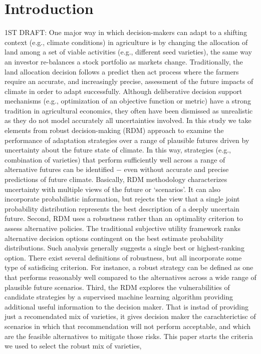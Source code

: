 \documentclass[syngen,nonblindrev]{informs3-syngen}
\begin{document}
\section{Introduction}
1ST DRAFT:
One major way in which decision-makers can adapt to a shifting context (e.g., climate conditions) in agriculture is by changing the allocation of land among a set of viable activities (e.g., different seed varieties), the same way an investor re-balances a stock portfolio as markets change. Traditionally, the land allocation decision follows a predict then act process where the farmers require an accurate, and increasingly precise, assessment of the future impacts of climate in order to adapt successfully. Although deliberative decision support mechanisms (e.g., optimization of an objective function or metric) have a strong tradition in agricultural economics, they often have been dismissed as unrealistic as they do not model accurately all uncertainties involved. 
In this study we take elements from robust decision-making (RDM) approach to examine the performance of adaptation strategies over a range of plausible futures driven by uncertainty about the future state of climate. In this way, strategies (e.g., combination of varieties) that perform sufficiently well across a range of alternative futures can be identified − even without accurate and precise predictions of future climate.
Basically, RDM methodology characterizes uncertainty with multiple views of the future or ‘scenarios’. It can also incorporate probabilistic information, but rejects the view that a single joint probability distribution represents the best description of a deeply uncertain future. Second, RDM uses a robustness rather than an optimality criterion to assess alternative policies. The traditional subjective utility framework ranks alternative decision options contingent on the best estimate probability distributions. Such analysis generally suggests a single best or highest-ranking option. There exist several definitions of robustness, but all incorporate some type of satisficing criterion. For instance, a robust strategy can be defined as one that performs reasonably well compared to the alternatives across a wide range of plausible future scenarios. Third, the RDM explores the vulnerabilities of candidate strategies by a supervised machine learning algorithm providing additional useful information to the decision maker. That is instad of providing just a recomendated mix of varieties, it gives decision maker the carachterictisc of scenarios in which that recommendation will not perform acceptable, and which are the feasible alternatives to mitigate those risks.
This paper starts the criteria we used to select the robust mix of varieties, 
\end{document}
